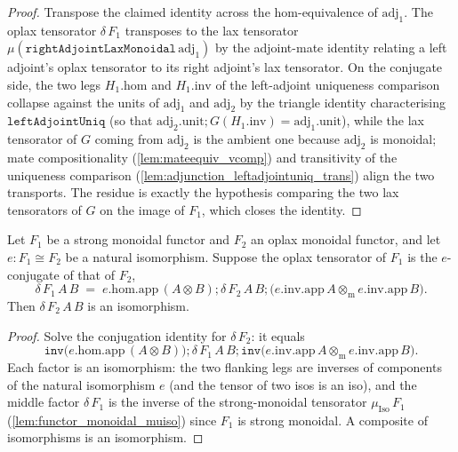 \begin{proof}
  \leanok
  Transpose the claimed identity across the hom-equivalence of \(\mathrm{adj}_1\). The oplax
  tensorator \(\delta\,F_1\) transposes to the lax tensorator
  \(\mu(\mathtt{rightAdjointLaxMonoidal}\,\mathrm{adj}_1)\) by the adjoint-mate identity relating a
  left adjoint's oplax tensorator to its right adjoint's lax tensorator. On the conjugate side, the
  two legs \(H_1.\mathrm{hom}\) and \(H_1.\mathrm{inv}\) of the left-adjoint uniqueness comparison
  collapse against the units of \(\mathrm{adj}_1\) and \(\mathrm{adj}_2\) by the triangle identity
  characterising \(\mathtt{leftAdjointUniq}\) (so that
  \(\mathrm{adj}_2.\mathrm{unit} \mathbin{;} G(H_1.\mathrm{inv}) = \mathrm{adj}_1.\mathrm{unit}\)),
  while the lax tensorator of \(G\) coming from \(\mathrm{adj}_2\) is the ambient one because
  \(\mathrm{adj}_2\) is monoidal; mate compositionality
  (\cref{lem:mateequiv_vcomp}) and transitivity of the uniqueness comparison
  (\cref{lem:adjunction_leftadjointuniq_trans}) align the two transports. The residue is exactly the
  hypothesis comparing the two lax tensorators of \(G\) on the image of \(F_1\), which closes the
  identity.
\end{proof}

\begin{lemma}
  \label{lem:isiso_oplaxdelta_of_conj}
  Let \(F_1\) be a strong monoidal functor and \(F_2\) an oplax monoidal functor, and let
  \(e : F_1 \cong F_2\) be a natural isomorphism. Suppose the oplax tensorator of \(F_1\) is the
  \(e\)-conjugate of that of \(F_2\),
  \[
    \delta\,F_1\,A\,B
      \;=\; e.\mathrm{hom}.\mathrm{app}\,(A \otimes B)
        \mathbin{;} \delta\,F_2\,A\,B
        \mathbin{;} \bigl(e.\mathrm{inv}.\mathrm{app}\,A \otimes_{\mathrm m}
          e.\mathrm{inv}.\mathrm{app}\,B\bigr).
  \]
  Then \(\delta\,F_2\,A\,B\) is an isomorphism.
\end{lemma}
\begin{proof}
  \leanok
  Solve the conjugation identity for \(\delta\,F_2\): it equals
  \[
    \mathtt{inv}\bigl(e.\mathrm{hom}.\mathrm{app}\,(A \otimes B)\bigr)
      \mathbin{;} \delta\,F_1\,A\,B
      \mathbin{;} \mathtt{inv}\bigl(e.\mathrm{inv}.\mathrm{app}\,A \otimes_{\mathrm m}
        e.\mathrm{inv}.\mathrm{app}\,B\bigr).
  \]
  Each factor is an isomorphism: the two flanking legs are inverses of components of the natural
  isomorphism \(e\) (and the tensor of two isos is an iso), and the middle factor \(\delta\,F_1\) is
  the inverse of the strong-monoidal tensorator \(\mu_{\mathrm{Iso}}\,F_1\)
  (\cref{lem:functor_monoidal_muiso}) since \(F_1\) is strong monoidal. A composite of isomorphisms
  is an isomorphism.
\end{proof}

